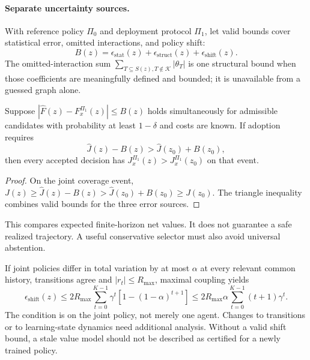 \documentclass[runningheads]{llncs}
\newcommand{\family}{\mathcal K}
\newcommand{\noop}{z_0}
\begin{document}
\paragraph{Separate uncertainty sources.}
With reference policy $\Pi_0$ and deployment protocol $\Pi_1$, let valid bounds cover statistical error, omitted interactions, and policy shift:
\begin{equation}
    B(z)=\epsilon_{\mathrm{stat}}(z)+\epsilon_{\mathrm{struct}}(z)+\epsilon_{\mathrm{shift}}(z).
\end{equation}
The omitted-interaction sum $\sum_{T\subseteq S(z),T\notin\family}|\theta_T|$ is one structural bound when those coefficients are meaningfully defined and bounded; it is unavailable from a guessed graph alone.
\begin{proposition}\label{prop:commit}
    Suppose $|\hat F(z)-F_x^{\Pi_1}(z)|\le B(z)$ holds simultaneously for admissible candidates with probability at least $1-\delta$ and costs are known. If adoption requires
    \begin{equation}\label{eq:commit}
        \hat J(z)-B(z)>\hat J(\noop)+B(\noop),
    \end{equation}
    then every accepted decision has $J_x^{\Pi_1}(z)>J_x^{\Pi_1}(\noop)$ on that event.
\end{proposition}
\begin{proof}
    On the joint coverage event, $J(z)\ge\hat J(z)-B(z)>\hat J(\noop)+B(\noop)\ge J(\noop)$. The triangle inequality combines valid bounds for the three error sources.
\end{proof}
This compares expected finite-horizon net values. It does not guarantee a safe realized trajectory. A useful conservative selector must also avoid universal abstention.

If joint policies differ in total variation by at most $\alpha$ at every relevant common history, transitions agree and $|r_t|\le R_{\max}$, maximal coupling yields
\begin{equation}
    \epsilon_{\mathrm{shift}}(z)\le2R_{\max}\sum_{t=0}^{K-1}\gamma^t[1-(1-\alpha)^{t+1}]
    \le2R_{\max}\alpha\sum_{t=0}^{K-1}(t+1)\gamma^t.
\end{equation}
The condition is on the joint policy, not merely one agent. Changes to transitions or to learning-state dynamics need additional analysis. Without a valid shift bound, a stale value model should not be described as certified for a newly trained policy.
\end{document}
